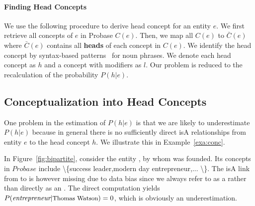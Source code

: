 \vspace{-4mm}
\paragraph*{Finding Head Concepts}
We use the following procedure to derive head concept for an entity $e$.
We first retrieve all concepts of $e$ in Probase $C(e)$.
Then, we map all $C(e)$ to $\bar{C}(e)$ where $\bar{C}(e)$ contains all {\bf heads} of each concept in $C(e)$.
We identify the head concept by syntax-based patterns~\cite{ponzetto2007deriving} for noun phrases.
We denote each head concept as $h$ and a concept with modifiers as ${l}$.
Our problem is reduced to the recalculation of the probability $P({h}|e)$.

\vspace{-4mm}
\subsection{Conceptualization into Head Concepts}
One problem in the estimation of $P(h|e)$ is that we are likely to underestimate $P(h|e)$ because in general there is no sufficiently direct isA relationships from entity $e$ to the head concept $h$.
We illustrate this in Example~\ref{exa:conc}.





{\footnotesize
\begin{example}[Underestimation]
\label{exa:conc}
In Figure~\ref{fig:bipartite}, consider the entity , by whom  was founded. 
Its concepts in $Probase$ include \ac{\{success leader,modern day entrepreneur,... \}}. 
The isA link from  to  is however missing due to data bias since we always refer to  as a  rather than directly as an . 
The direct computation yields $P(\ac{entrepreneur}|\at{\text{Thomas Watson}})=0$, which is obviously an underestimation.
\end{example}
}


